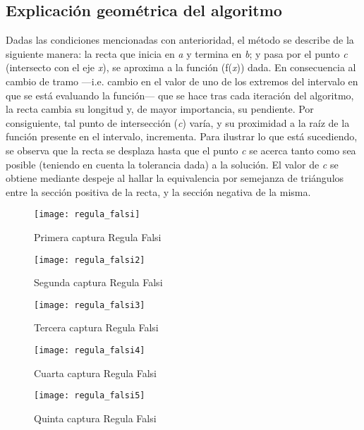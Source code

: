 \documentclass{article}
\begin{document}
\subsection{Explicación geométrica del algoritmo}
Dadas las condiciones mencionadas con anterioridad, el método se describe de la siguiente manera: la recta que inicia en \emph{a} y termina en \emph{b}; y pasa por el punto \emph{c} (intersecto con el eje \emph{x}), se aproxima a la función (f(\emph{x})) dada. En consecuencia al cambio de tramo —i.e. cambio en el valor de uno de los extremos del intervalo en que se está evaluando la función— que se hace tras cada iteración del algoritmo, la recta cambia su longitud y, de mayor importancia, su pendiente. Por consiguiente, tal punto de intersección (\emph{c}) varía, y su proximidad a la raíz de la función presente en el intervalo, incrementa. Para ilustrar lo que está sucediendo, se observa que la recta se desplaza hasta que el punto \emph{c} se acerca tanto como sea posible (teniendo en cuenta la tolerancia dada) a la solución. El valor de \emph{c} se obtiene mediante despeje al hallar la equivalencia por semejanza de triángulos entre la sección positiva de la recta, y la sección negativa de la misma.

\begin{figure}[H]
    \centering
    \texttt{[image: regula\_falsi]}
    \caption{Primera captura Regula Falsi}
    \label{fig:regula_falsi}
\end{figure}

\begin{figure}[H]
    \centering
    \texttt{[image: regula\_falsi2]}
    \caption{Segunda captura Regula Falsi}
    \label{fig:regula_falsi2}
\end{figure}

\begin{figure}[H]
    \centering
    \texttt{[image: regula\_falsi3]}
    \caption{Tercera captura Regula Falsi}
    \label{fig:regula_falsi3}
\end{figure}

\begin{figure}[H]
    \centering
    \texttt{[image: regula\_falsi4]}
    \caption{Cuarta captura Regula Falsi}
    \label{fig:regula_falsi4}
\end{figure}

\begin{figure}[H]
    \centering
    \texttt{[image: regula\_falsi5]}
    \caption{Quinta captura Regula Falsi}
    \label{fig:regula_falsi5}
\end{figure}
\end{document}
